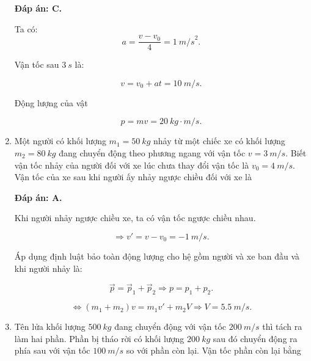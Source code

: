 \begin{enumerate}[label=\bfseries Câu \arabic*:]
	\hideall
	{	
		\textbf{Đáp án: C.}
		
		Ta có: $$a = \dfrac{v - v_0}{4} = \SI{1}{m/s}^2.$$
		
		Vận tốc sau $\SI{3}{s}$ là:
		
		$$v = v_0 + at = \SI{10}{m/s}.$$
		
		Động lượng của vật
		
		$$ p =mv = \SI{20}{kg \cdot m/s}.$$
	}
	\item {}
	
	
	{Một người có khối lượng $m_1=\SI{50}{kg}$ nhảy từ một chiếc xe có khối lượng $m_2 = \SI{80}{kg}$ đang chuyển động theo phương ngang với vận tốc $v = \SI{3}{m/s}$. Biết vận tốc nhảy của người đối với xe lúc chưa thay đổi vận tốc là $v_0 = \SI{4}{m/s}$. Vận tốc của xe sau khi người ấy nhảy ngược chiều đối với xe là
	}
	
	\hideall
	{	
		\textbf{Đáp án: A.}
		
		Khi người nhảy ngược chiều xe, ta có vận tốc ngược chiều nhau.
		
		$$\Rightarrow v' = v - v_0 = - \SI{1}{m/s}.$$
		
		Áp dụng định luật bảo toàn động lượng cho hệ gồm người và xe ban đầu và khi người nhảy là:
		
		$$\vec p = \vec p_1 + \vec p_2 \Rightarrow p = p_1 + p_2.$$
		
		$$\Leftrightarrow (m_1+m_2)v = m_1v'+m_2V \Rightarrow V = \SI{5,5}{m/s}.$$
		
		
	}
	\item {}
	
	
	{Tên lửa khối lượng $\SI{500}{kg}$ đang chuyển động với vận tốc  $\SI{200}{m/s}$ thì tách ra làm hai phần. Phần bị tháo rời có khối lượng $\SI{200}{kg}$ sau đó chuyển động ra phía sau với vận tốc $\SI{100}{m/s}$ so với phần còn lại. Vận tốc phần còn lại bằng
	}
	

\end{enumerate}
